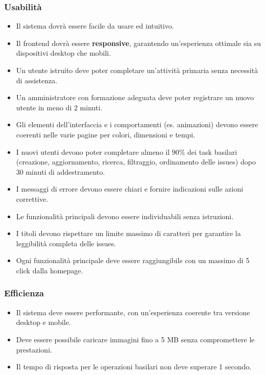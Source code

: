 \subsubsection{Usabilità}
\begin{itemize}
    \item Il sistema dovrà essere facile da usare ed intuitivo.
    \item Il frontend dovrà essere \textbf{responsive}, garantendo un'esperienza ottimale sia su dispositivi desktop che mobili.
    \item Un utente istruito deve poter completare un'attività primaria senza necessità di assistenza.
    \item Un amministratore con formazione adeguata deve poter registrare un nuovo utente in meno di 2 minuti.
    \item Gli elementi dell'interfaccia e i comportamenti (es. animazioni) devono essere coerenti nelle varie pagine per colori, dimensioni e tempi.
    \item I nuovi utenti devono poter completare almeno il 90\% dei task basilari (creazione, aggiornamento, ricerca, filtraggio, ordinamento delle issues) dopo 30 minuti di addestramento.
    \item I messaggi di errore devono essere chiari e fornire indicazioni sulle azioni correttive.
    \item Le funzionalità principali devono essere individuabili senza istruzioni.
    \item I titoli devono rispettare un limite massimo di caratteri per garantire la leggibilità completa delle issues.
    \item Ogni funzionalità principale deve essere raggiungibile con un massimo di 5 click dalla homepage.
\end{itemize}

\subsubsection{Efficienza}
\begin{itemize}
    \item Il sistema deve essere performante, con un'esperienza coerente tra versione desktop e mobile.
    \item Deve essere possibile caricare immagini fino a 5 MB senza compromettere le prestazioni.
    \item Il tempo di risposta per le operazioni basilari non deve superare 1 secondo.
\end{itemize}


